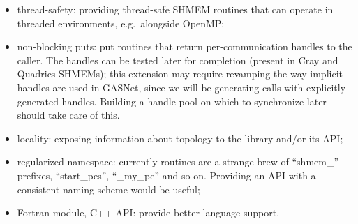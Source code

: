 \documentclass[english]{article}
\begin{document}
\begin{itemize}
\item thread-safety: providing thread-safe SHMEM routines that can
operate in threaded environments, e.g.\ alongside OpenMP;
\item non-blocking puts: put routines that return per-communication
handles to the caller. The handles can be tested later for completion
(present in Cray and Quadrics SHMEMs); this extension may require
revamping the way implicit handles are used in GASNet, since we will
be generating calls with explicitly generated handles. Building a
handle pool on which to synchronize later should take care of this.
\item locality: exposing information about topology to the library
and/or its API;
\item regularized namespace: currently routines are a strange brew of
``shmem\_'' prefixes, ``start\_pes'', ``\_my\_pe'' and so
on. Providing an API with a consistent naming scheme would be useful;
\item Fortran module, C++ API: provide better language support.
\end{itemize}
\end{document}
